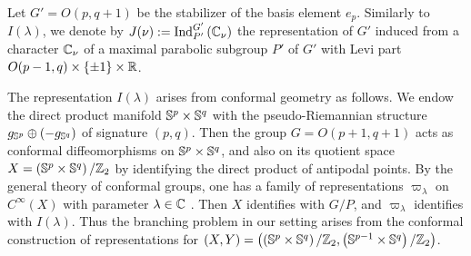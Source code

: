 \documentclass[reqno,12pt]{pja00} %
\newcommand{\assign}{:=}
\newcommand{\tmop}[1]{\ensuremath{\operatorname{#1}}}
\newcommand{\Ind}{\mbox{\normalfont Ind}}
\theoremstyle{definition}
\theoremstyle{exampstyle} \newtheorem{examp}[theorem]{Theorem}
\begin{document}
Let $G'=O(p,q+1)$ be the stabilizer of the basis element $e_p$. Similarly to $I(\lambda)$,
we denote by $J(\nu):=\Ind_{P'}^{G'}\left( \C_\nu \right)$ the representation of $G'$
induced from a character $\mathbb{C}_\nu$ of a
maximal parabolic
subgroup $P'$ of $G'$ with Levi part $O(p-1,q)\times\left\{ \pm1 \right\}\times\mathbb{R}$.

The representation $I (\lambda)$ arises from conformal
geometry as follows. We endow the direct product manifold $\mathbb{S}^p\times\mathbb{S}^q$ with the pseudo-Riemannian structure $g_{\mathbb{S}^p}\oplus\left( -g_{\mathbb{S}^q} \right)$ of signature $(p,q)$.
Then the group $G=O(p+1,q+1)$ acts as conformal diffeomorphisms on $\mathbb{S}^p\times\mathbb{S}^q$, and also on its quotient space $X=\left( \mathbb{S}^p\times\mathbb{S}^q \right)/\mathbb{Z}_2$
by identifying
the direct product of
antipodal points. By
the general theory of conformal {groups}, one has a family of representations $\varpi_\lambda$ on $C^\infty(X)$
with parameter $\lambda\in\mathbb{C}$ \cite[Sect.\ 2]{KO1}. Then $X$ identifies with $G/P$, and $\varpi_\lambda$ identifies with $I(\lambda)$. Thus the
branching problem in our setting arises from the
conformal construction of representations for $(X,Y)=\left( \left(\mathbb{S}^p\times\mathbb{S}^q  \right)/\mathbb{Z}_2,\left( \mathbb{S}^{p-1}\times\mathbb{S}^q \right)/\mathbb{Z}_2 \right)$.
\end{document}
